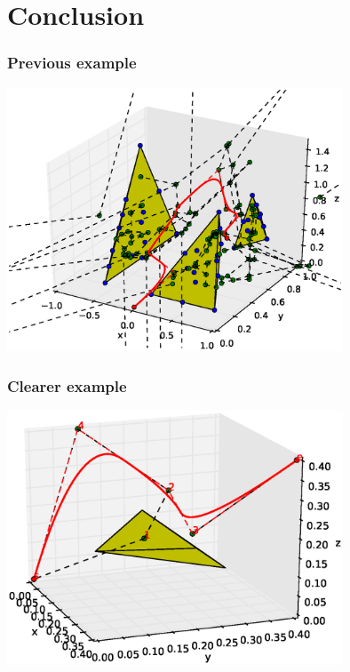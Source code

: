 \section{Conclusion}

\begin{frame}
  \frametitle{Previous example}
  \begin{center}
    \includegraphics[width=0.75\textwidth, trim=110 30 50 50, clip]{img/screenFinal.eps}
  \end{center}
\end{frame}

\begin{frame}
  \frametitle{Clearer example}
  \begin{center}
    \includegraphics[width=0.75\textwidth, trim=110 30 50 50, clip]{img/screenFinal2.eps}
  \end{center}
\end{frame}

